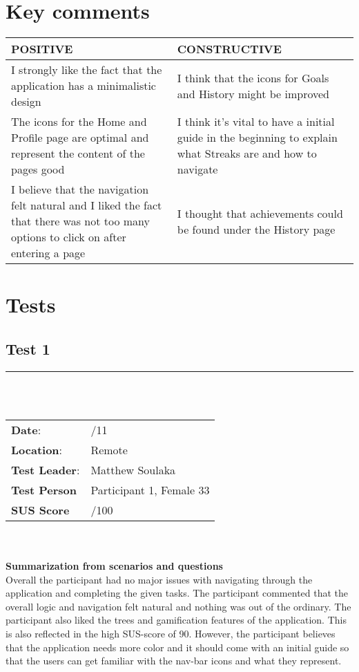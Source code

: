 \section{Key comments}
\begin{tabularx}{1\textwidth}{ || >{\centering\arraybackslash}X | >{\centering\arraybackslash}X || }
\hline
\hline
\textbf{POSITIVE} & \textbf{CONSTRUCTIVE} \\
\hline
\hline
I strongly like the fact that the application has a minimalistic design & I think that the icons for Goals and History might be improved \\
\hline
The icons for the Home and Profile page are optimal and represent the content of the pages good & I think it's vital to have a initial guide in the beginning to explain what Streaks are and how to navigate \\
\hline
I believe that the navigation felt natural and I liked the fact that there was not too many options to click on after entering a page & I thought that achievements could be found under the History page \\
\hline
\hline
\end{tabularx}

\section{Tests}
\subsection{Test 1}

\noindent\rule{15.1cm}{0.4pt}\\
\\
\begin{tabularx}{0.6\textwidth}{ >{\raggedright\arraybackslash}X  >{\raggedright\arraybackslash}X  }
\textbf{Date}: & 21/11  \\
\textbf{Location}: & Remote  \\
\textbf{Test Leader}: & Matthew Soulaka  \\
\textbf{Test Person} & Participant 1, Female 33  \\
\textbf{SUS Score} & 90/100  \\

\end{tabularx}\\
\\
\textbf{Summarization from scenarios and questions} \\
\noindent Overall the participant had no major issues with navigating through the application and completing the given tasks. The participant commented that the overall logic and navigation felt natural and nothing was out of the ordinary. The participant also liked the trees and gamification features of the application. This is also reflected in the high SUS-score of 90. However, the participant believes that the application needs more color and it should come with an initial guide so that the users can get familiar with the nav-bar icons and what they represent.\\

